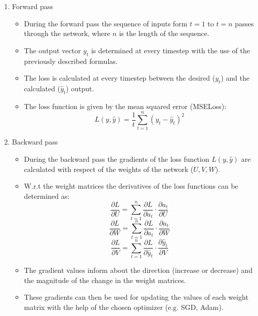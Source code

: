 \begin{enumerate}
    \item Forward pass
    \begin{itemize}
        \item During the forward pass the sequence of inputs form $t=1$ to $t=n$ passes through the network, where $n$ is the length of the sequence.
        \item The output vector $y_t$ is determined at every timestep with the use of the previously described formulas. 
        \item The loss is calculated at every timestep between the desired ($y_t$) and the calculated ($\hat y_t$) output. 
        \item The loss function is given by the mean squared error (MSELoss):
        \begin{equation}
            L(y, \hat y) = \frac{1}{t} \sum_{t=1}^{n} (y_t - \hat y_t)^2
        \end{equation}
    \end{itemize}
    \item Backward pass
        \begin{itemize}
        \item During the backward pass the gradients of the loss function  $L(y, \hat y)$ are calculated with respect of the weights of the network ($U, V, W$). 
        \item W.r.t the weight matrices the derivatives of the loss functions can be determined as:
        \begin{equation}
            \frac{\partial L}{\partial U} = \sum_{t=1}^n \frac{\partial L}{\partial a_t} \cdot \frac{\partial a_t}{\partial U}
        \end{equation}
        \begin{equation}
            \frac{\partial L}{\partial W} = \sum_{t=1}^n \frac{\partial L}{\partial a_t} \cdot \frac{\partial a_t}{\partial W}
        \end{equation}
        \begin{equation}
            \frac{\partial L}{\partial V} = \sum_{t=1}^n \frac{\partial L}{\partial \hat y_t} \cdot \frac{\partial \hat y_t}{\partial V}
        \end{equation}
        \item The gradient values inform about the direction (increase or decrease) and the magnitude of the change in the weight matrices. 
        \item These gradients can then be used for updating the values of each weight matrix with the help of the chosen optimizer (e.g. SGD, Adam).
    \end{itemize}
\end{enumerate}

